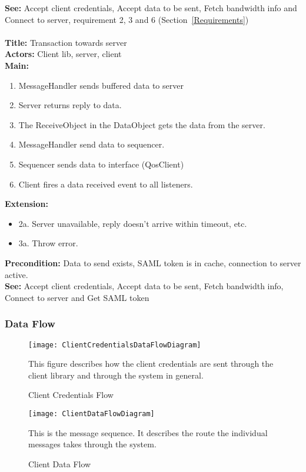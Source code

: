 		\textbf{See:} Accept client credentials, Accept data to be sent, Fetch bandwidth info and Connect to server, requirement 2, 3 and 6 (Section~\ref{Requirements})
		\\\\
		\textbf{Title:} Transaction towards server \\
		\textbf{Actors:} Client lib, server, client \\
		\textbf{Main:}
		\begin{enumerate}
			\item MessageHandler sends buffered data to server
			\item Server returns reply to data.
			\item The ReceiveObject in the DataObject gets the data from the server.
			\item MessageHandler send data to sequencer.
			\item Sequencer sends data to interface (QosClient)
			\item Client fires a data received event to all listeners.
		\end{enumerate}
		\textbf{Extension:}
		\begin{itemize}
			 \item[] 2a. Server unavailable, reply doesn't arrive within timeout, etc.
			 \item[] 3a. Throw error.
		\end{itemize}
		\textbf{Precondition:} Data to send exists, SAML token is in cache, connection to server active.\\
		\textbf{See:} Accept client credentials, Accept data to be sent, Fetch bandwidth info, Connect to server and Get SAML token
		
	\subsubsection{Data Flow}\label{textual client data flow}
        
    \begin{figure}[h]
        \centering
        \texttt{[image: ClientCredentialsDataFlowDiagram]}
        \caption{Client Credentials Flow}
        This figure describes how the client credentials are sent through the client library and through the system in general. 
        \label{fig:ClientCredentialsDataFlowDiagram}
    \end{figure}
    
    \begin{figure}[h]
        \centering
        \texttt{[image: ClientDataFlowDiagram]}
        \caption{Client Data Flow}
        This is the message sequence. It describes the route the individual messages takes through the system. 
        \label{fig:ClientDataFlowDiagram}
    \end{figure}
    
